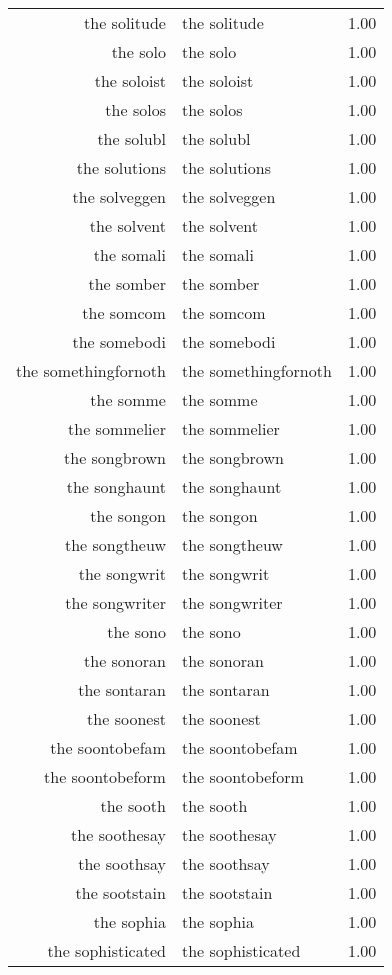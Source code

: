 \begin{table}[ht]
\begin{tabular}{rlr}
  the solitude & the solitude & 1.00 \\ 
  the solo & the solo & 1.00 \\ 
  the soloist & the soloist & 1.00 \\ 
  the solos & the solos & 1.00 \\ 
  the solubl & the solubl & 1.00 \\ 
  the solutions & the solutions & 1.00 \\ 
  the solveggen & the solveggen & 1.00 \\ 
  the solvent & the solvent & 1.00 \\ 
  the somali & the somali & 1.00 \\ 
  the somber & the somber & 1.00 \\ 
  the somcom & the somcom & 1.00 \\ 
  the somebodi & the somebodi & 1.00 \\ 
  the somethingfornoth & the somethingfornoth & 1.00 \\ 
  the somme & the somme & 1.00 \\ 
  the sommelier & the sommelier & 1.00 \\ 
  the songbrown & the songbrown & 1.00 \\ 
  the songhaunt & the songhaunt & 1.00 \\ 
  the songon & the songon & 1.00 \\ 
  the songtheuw & the songtheuw & 1.00 \\ 
  the songwrit & the songwrit & 1.00 \\ 
  the songwriter & the songwriter & 1.00 \\ 
  the sono & the sono & 1.00 \\ 
  the sonoran & the sonoran & 1.00 \\ 
  the sontaran & the sontaran & 1.00 \\ 
  the soonest & the soonest & 1.00 \\ 
  the soontobefam & the soontobefam & 1.00 \\ 
  the soontobeform & the soontobeform & 1.00 \\ 
  the sooth & the sooth & 1.00 \\ 
  the soothesay & the soothesay & 1.00 \\ 
  the soothsay & the soothsay & 1.00 \\ 
  the sootstain & the sootstain & 1.00 \\ 
  the sophia & the sophia & 1.00 \\ 
  the sophisticated & the sophisticated & 1.00 \\ 

\end{tabular}
\end{table}
